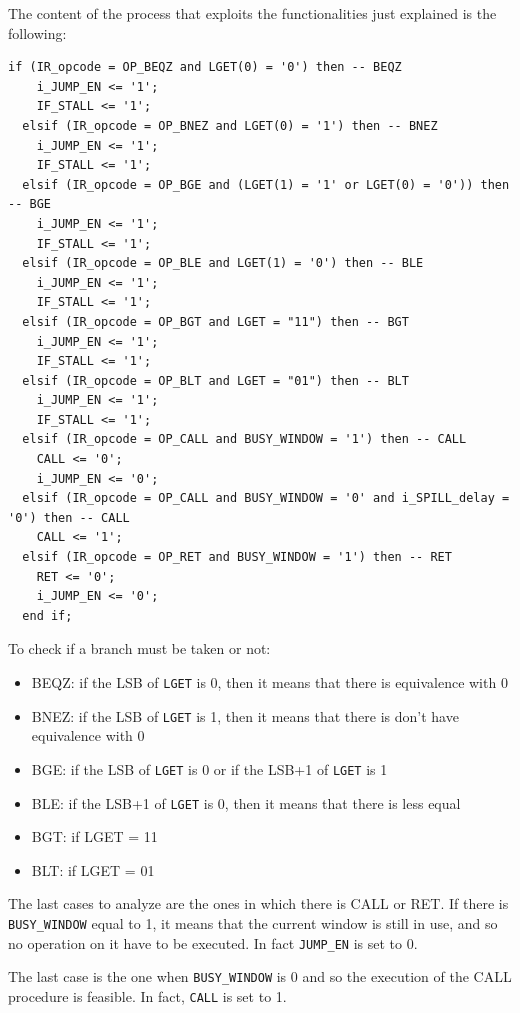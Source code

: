 The content of the process that exploits the functionalities just explained is the following:
\newline

\begin{lstlisting}[style=vhdl,caption={VHDL code for the conditional branch},label=conditional_branches_code]
  if (IR_opcode = OP_BEQZ and LGET(0) = '0') then -- BEQZ 
    i_JUMP_EN <= '1';
    IF_STALL <= '1';
  elsif (IR_opcode = OP_BNEZ and LGET(0) = '1') then -- BNEZ
    i_JUMP_EN <= '1';
    IF_STALL <= '1';
  elsif (IR_opcode = OP_BGE and (LGET(1) = '1' or LGET(0) = '0')) then -- BGE
    i_JUMP_EN <= '1';
    IF_STALL <= '1';
  elsif (IR_opcode = OP_BLE and LGET(1) = '0') then -- BLE
    i_JUMP_EN <= '1';
    IF_STALL <= '1';
  elsif (IR_opcode = OP_BGT and LGET = "11") then -- BGT
    i_JUMP_EN <= '1';
    IF_STALL <= '1';
  elsif (IR_opcode = OP_BLT and LGET = "01") then -- BLT
    i_JUMP_EN <= '1';
    IF_STALL <= '1';
  elsif (IR_opcode = OP_CALL and BUSY_WINDOW = '1') then -- CALL
    CALL <= '0';
    i_JUMP_EN <= '0';	
  elsif (IR_opcode = OP_CALL and BUSY_WINDOW = '0' and i_SPILL_delay = '0') then -- CALL
    CALL <= '1';
  elsif (IR_opcode = OP_RET and BUSY_WINDOW = '1') then -- RET
    RET <= '0';
    i_JUMP_EN <= '0';
  end if;
\end{lstlisting}

To check if a branch must be taken or not:
\begin{itemize}
  \item BEQZ: if the LSB of \texttt{LGET} is 0, then it means that there is equivalence with 0
  \item BNEZ: if the LSB of \texttt{LGET} is 1, then it means that there is don't have equivalence with 0
  \item BGE: if the LSB of \texttt{LGET} is 0 or if the LSB+1 of \texttt{LGET} is 1
  \item BLE: if the LSB+1 of \texttt{LGET} is 0, then it means that there is less equal
  \item BGT: if LGET = 11
  \item BLT: if LGET = 01
\end{itemize}

The last cases to analyze are the ones in which there is CALL or RET. If there is \texttt{BUSY\_WINDOW} equal to 1, it means that the current window is still in use, and so no operation on it have to be executed. In fact \texttt{JUMP\_EN} is set to 0.

The last case is the one when \texttt{BUSY\_WINDOW} is 0 and so the execution of the CALL procedure is feasible. In fact, \texttt{CALL} is set to 1.

